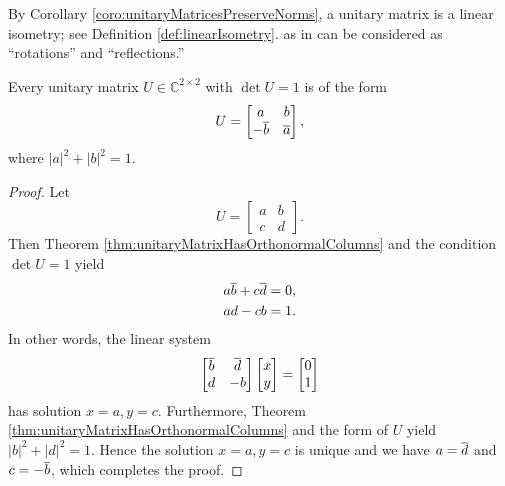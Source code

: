 \begin{rem}
  By Corollary \ref{coro:unitaryMatricesPreserveNorms},
  a unitary matrix is a linear isometry;
  see Definition \ref{def:linearIsometry}.
  as in can be considered
  as ``rotations'' and ``reflections.''
\end{rem}

\begin{thm}
  \label{thm:unitaryMatrices2by2}
  Every unitary matrix $U\in \mathbb{C}^{2\times 2}$
  with $\det U=1$ is of the form
  \begin{equation}
    \label{eq:unitaryMatrices2by2}
    U =
    \begin{bmatrix}
      a & b \\ -\overline{b} & \overline{a}
    \end{bmatrix},
  \end{equation}
  where $|a|^2+|b|^2=1$.
\end{thm}
\begin{proof}
  Let 
  \begin{displaymath}
    U=
    \begin{bmatrix}
      a & b \\ c & d
    \end{bmatrix}.    
  \end{displaymath}
  Then Theorem \ref{thm:unitaryMatrixHasOrthonormalColumns}
  and the condition $\det U=1$ yield
  \begin{align*}
    a \overline{b} + c\overline{d} &= 0,
    \\
    a d - cb &= 1.
  \end{align*}
  In other words, the linear system
  \begin{equation*}
    \begin{bmatrix}
      \overline{b} & \overline{d} \\ d & -b
    \end{bmatrix}
    \begin{bmatrix}
      x \\ y
    \end{bmatrix}
    =
    \begin{bmatrix}
      0 \\ 1
    \end{bmatrix}
  \end{equation*}
  has solution $x=a, y=c$.
  Furthermore, Theorem \ref{thm:unitaryMatrixHasOrthonormalColumns}
  and the form of $U$ yield
  $|b|^2+|d|^2=1$.
  Hence the solution $x=a, y=c$ is unique
  and we have $a=\overline{d}$ and $c=-\overline{b}$,
  which completes the proof.
\end{proof}

